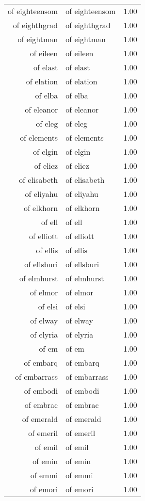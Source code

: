 \begin{table}[ht]
\begin{tabular}{rlr}
  of eighteensom & of eighteensom & 1.00 \\ 
  of eighthgrad & of eighthgrad & 1.00 \\ 
  of eightman & of eightman & 1.00 \\ 
  of eileen & of eileen & 1.00 \\ 
  of elast & of elast & 1.00 \\ 
  of elation & of elation & 1.00 \\ 
  of elba & of elba & 1.00 \\ 
  of eleanor & of eleanor & 1.00 \\ 
  of eleg & of eleg & 1.00 \\ 
  of elements & of elements & 1.00 \\ 
  of elgin & of elgin & 1.00 \\ 
  of eliez & of eliez & 1.00 \\ 
  of elisabeth & of elisabeth & 1.00 \\ 
  of eliyahu & of eliyahu & 1.00 \\ 
  of elkhorn & of elkhorn & 1.00 \\ 
  of ell & of ell & 1.00 \\ 
  of elliott & of elliott & 1.00 \\ 
  of ellis & of ellis & 1.00 \\ 
  of ellsburi & of ellsburi & 1.00 \\ 
  of elmhurst & of elmhurst & 1.00 \\ 
  of elmor & of elmor & 1.00 \\ 
  of elsi & of elsi & 1.00 \\ 
  of elway & of elway & 1.00 \\ 
  of elyria & of elyria & 1.00 \\ 
  of em & of em & 1.00 \\ 
  of embarq & of embarq & 1.00 \\ 
  of embarrass & of embarrass & 1.00 \\ 
  of embodi & of embodi & 1.00 \\ 
  of embrac & of embrac & 1.00 \\ 
  of emerald & of emerald & 1.00 \\ 
  of emeril & of emeril & 1.00 \\ 
  of emil & of emil & 1.00 \\ 
  of emin & of emin & 1.00 \\ 
  of emmi & of emmi & 1.00 \\ 
  of emori & of emori & 1.00 \\ 

\end{tabular}
\end{table}
